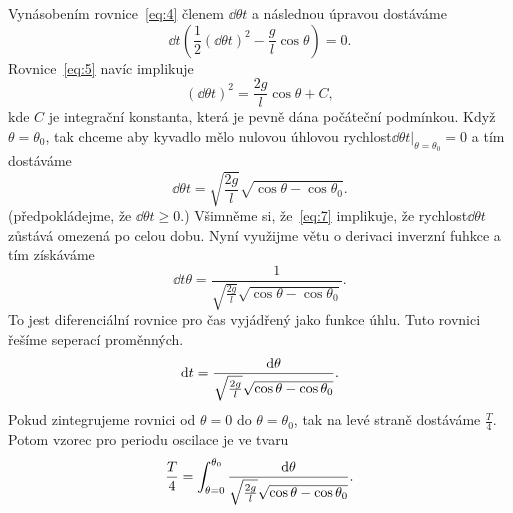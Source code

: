 \documentclass[reqno, a4paper]{amsart}
\begin{document}
Vynásobením rovnice~\eqref{eq:4} členem $\dd{\theta}{t}$ a následnou úpravou dostáváme
\begin{equation}
  \label{eq:5}
  \dd{}{t}
  \left(
    \frac{1}{2}
    \left(
      \dd{\theta}{t}
    \right)^2
    -
    \frac{g}{l}
    \cos \theta
  \right)
  =
  0
  .
\end{equation}
Rovnice~\eqref{eq:5} navíc implikuje
\begin{equation}
  \label{eq:6}
  \left(
    \dd{\theta}{t}
  \right)^2
  =
  \frac{2g}{l}
  \cos \theta
  +
  C
  ,
\end{equation}
kde $C$ je integrační konstanta, která je pevně dána počáteční podmínkou. Když $\theta = \theta_{0}$, tak chceme aby kyvadlo mělo nulovou úhlovou rychlost$\left. \dd{\theta}{t} \right|_{\theta = \theta_{0}}= 0$ a tím dostáváme
\begin{equation}
  \label{eq:7}
  \dd{\theta}{t}
  =
  \sqrt{
    \frac{2g}{l}
  }
  \sqrt{\cos \theta - \cos \theta_{0}}.
\end{equation}
(předpokládejme, že $\dd{\theta}{t} \geq 0$.) Všimněme si, že~\eqref{eq:7} implikuje, že rychlost$\dd{\theta}{t}$ zůstává omezená po celou dobu. Nyní využijme větu o derivaci inverzní fuhkce a tím získáváme
\begin{equation}
  \label{eq:8}
  \dd{t}{\theta}
  =
  \frac{1}
  {
    \sqrt{
      \frac{2g}{l}
    }
    \sqrt{\cos \theta - \cos \theta_{0}}
  }
  .
\end{equation}
To jest diferenciální rovnice pro čas vyjádřený jako funkce úhlu. Tuto rovnici řešíme seperací proměnných.
\begin{equation}
  \label{eq:9}
  \mathrm{d} t  
  =
  \frac{\mathrm{d} \theta}
  {
    \sqrt{
      \frac{2g}{l}
    }
    \sqrt{\cos \theta - \cos \theta_{0}}
  }
  .
\end{equation}
Pokud zintegrujeme rovnici od $\theta=0$ do $\theta=\theta_{0}$, tak na levé straně dostáváme $\frac{T}{4}$. Potom vzorec pro periodu oscilace je ve tvaru
\begin{equation}
  \label{eq:10}
  \frac{T}{4}
  =
  \int_{\theta=0}^{\theta_{0}}
  \frac{\mathrm{d} \theta}
  {
    \sqrt{
      \frac{2g}{l}
    }
    \sqrt{\cos \theta - \cos \theta_{0}}
  }
  .
\end{equation}
\end{document}
